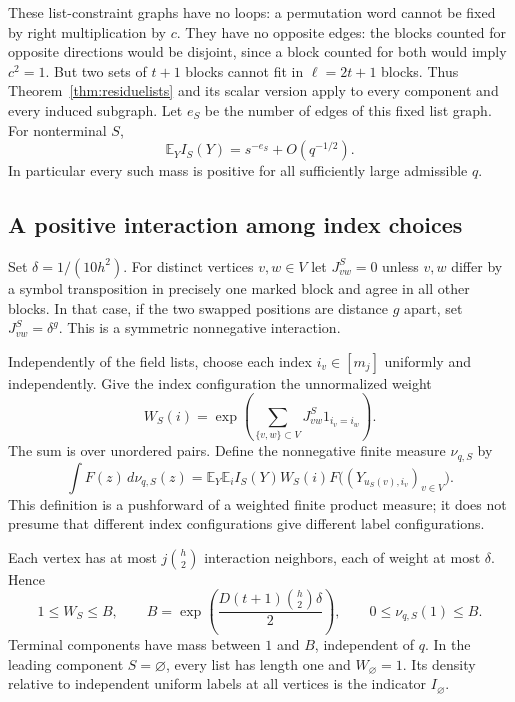\documentclass[11pt,a4paper]{article}
\numberwithin{equation}{section}
\theoremstyle{definition}
\theoremstyle{remark}
\newcommand{\E}{\mathbb E}
\begin{document}
These list-constraint graphs have no loops: a permutation word cannot
be fixed by right multiplication by $c$. They have no opposite edges:
the blocks counted for opposite directions would be disjoint, since
a block counted for both would imply $c^2=1$. But two sets of $t+1$
blocks cannot fit in $\ell=2t+1$ blocks. Thus Theorem~\ref{thm:residuelists}
and its scalar version apply to every component and every induced
subgraph. Let $e_S$ be the number of edges of this fixed list graph.
For nonterminal $S$,
\begin{equation}
 \E_Y I_S(Y)=s^{-e_S}+O(q^{-1/2}).
 \label{eq:validitymass}
\end{equation}
In particular every such mass is positive for all sufficiently large
admissible $q$.

\subsection{A positive interaction among index choices}

Set $\delta=1/(10h^2)$. For distinct vertices $v,w\in V$ let
$J^S_{vw}=0$ unless $v,w$ differ by a symbol transposition in precisely
one marked block and agree in all other blocks. In that case, if the
two swapped positions are distance $g$ apart, set $J^S_{vw}=\delta^g$.
This is a symmetric nonnegative interaction.

Independently of the field lists, choose each index
$i_v\in[m_j]$ uniformly and independently. Give the index configuration
the unnormalized weight
\begin{equation}
 W_S(i)=\exp\left(\sum_{\{v,w\}\subset V}
                  J^S_{vw}1_{i_v=i_w}\right).
 \label{eq:indexweight}
\end{equation}
The sum is over unordered pairs. Define the nonnegative finite measure
$\nu_{q,S}$ by
\begin{equation}
 \int F(z)\,d\nu_{q,S}(z)
 =\E_Y\E_i I_S(Y)W_S(i)
           F\bigl((Y_{u_S(v),i_v})_{v\in V}\bigr).
 \label{eq:component}
\end{equation}
This definition is a pushforward of a weighted finite product measure;
it does not presume that different index configurations give different
label configurations.

Each vertex has at most $j\binom h2$ interaction neighbors, each of
weight at most $\delta$. Hence
\begin{equation}
 1\le W_S\le B,
 \qquad B=\exp\left(\frac{D(t+1)\binom h2\delta}{2}\right),
 \qquad 0\le\nu_{q,S}(1)\le B.
 \label{eq:B}
\end{equation}
Terminal components have mass between $1$ and $B$, independent of
$q$. In the leading component $S=\varnothing$, every list has length
one and $W_\varnothing=1$. Its density relative to independent uniform
labels at all vertices is the indicator $I_\varnothing$.
\end{document}
